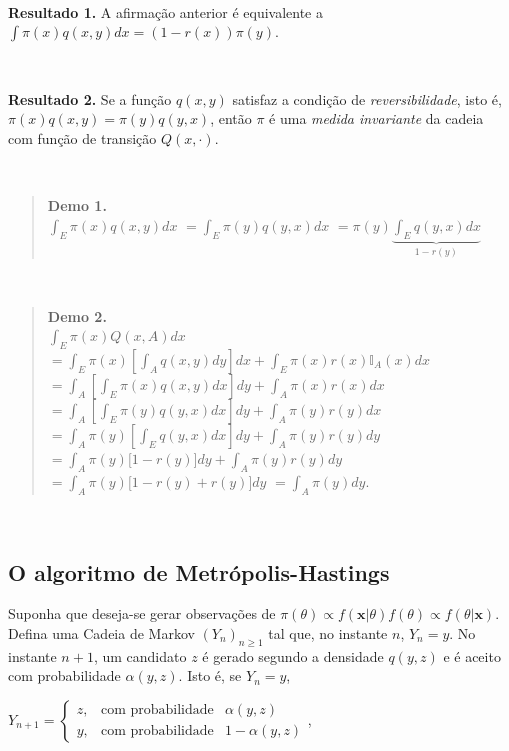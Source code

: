 \documentclass[
]{book}
\begin{document}
\(~\)

\textbf{Resultado 1.} A afirmação anterior é equivalente a \(\int\pi(x)q(x,y)dx=(1-r(x))\pi(y)\).

\(~\)

\textbf{Resultado 2.} Se a função \(q(x,y)\) satisfaz a condição de \emph{reversibilidade}, isto é, \(\pi(x)q(x,y)=\pi(y)q(y,x)\), então \(\pi\) é uma \emph{medida invariante} da cadeia com função de transição \(Q(x,\cdot)\).

\(~\)

\begin{quote}
\textbf{Demo 1.}\\
\(\displaystyle\int_E\pi(x)q(x,y)dx\)
\(=\displaystyle\int_E\pi(y)q(y,x)dx\) \(=\displaystyle\pi(y)\underbrace{\int_Eq(y,x)dx}_{1-r(y)}\)
\end{quote}

\(~\)

\begin{quote}
\textbf{Demo 2.}\\
\(\displaystyle\int_E \pi(x)Q(x,A)dx\)
\(=\displaystyle\int_E\pi(x)\left[\int_Aq(x,y)dy\right]dx+\int_E \pi(x) r(x)\mathbb{I}_A(x)dx\) \(=\displaystyle\int_A\left[\int_E\pi(x)q(x,y)dx\right]dy+\int_A\pi(x)r(x)dx\)
\(=\displaystyle\int_A\left[\int_E\pi(y)q(y,x)dx\right]dy+\int_A\pi(y)r(y)dx\)
\(=\displaystyle\int_A\pi(y)\left[\int_Eq(y,x)dx\right]dy+\int_A\pi(y)r(y)dy\)
\(=\displaystyle\int_A\pi(y)\Big[1-r(y)\Big]dy+\int_A\pi(y)r(y)dy\)
\(=\displaystyle\int_A\pi(y)\Big[1-r(y)+r(y)\Big]dy\)
\(=\displaystyle\int_A\pi(y)dy\).
\end{quote}

\(~\)

\hypertarget{o-algoritmo-de-metruxf3polis-hastings}{%
\subsection{\texorpdfstring{O algoritmo de \textbf{Metrópolis-Hastings}}{O algoritmo de Metrópolis-Hastings}}\label{o-algoritmo-de-metruxf3polis-hastings}}

Suponha que deseja-se gerar observações de \(\pi(\theta)\propto f(\boldsymbol x|\theta)f(\theta)\propto f(\theta|\boldsymbol x)\). Defina uma Cadeia de Markov \((Y_n)_{n\geq 1}\) tal que, no instante \(n\), \(Y_n=y\). No instante \(n+1\), um candidato \(z\) é gerado segundo a densidade \(q(y,z)\) e é aceito com probabilidade \(\alpha(y,z)\). Isto é, se \(Y_n=y\),

\(Y_{n+1}=\left\{\begin{array}{rcl} z,& \text{com probabilidade}& \alpha(y,z)\\ y,& \text{com probabilidade}& 1-\alpha(y,z)\end{array}\right.\),
\end{document}
